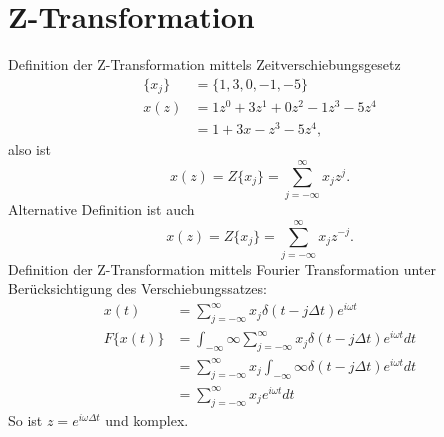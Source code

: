 \section{Z-Transformation}
Definition der Z-Transformation mittels Zeitverschiebungsgesetz
\[
\begin{split}
\{x_j\} & = \{1,3,0,-1,-5\}\\
x(z) & = 1z^0+3z^1+0z^2-1z^3-5z^4\\
& = 1+3x-z^3-5z^4,
\end{split}
\]
also ist
\begin{equation}
x(z) = Z\{x_j\} = \sum_{j=-\infty}^{\infty} x_j z^j.
\end{equation}
Alternative Definition ist auch
\[
x(z) = Z\{x_j\} = \sum_{j=-\infty}^{\infty} x_j z^{-j}.
\]
Definition der Z-Transformation mittels Fourier Transformation unter Berücksichtigung des Verschiebungssatzes:
\[
\begin{split}
x(t) & =  \sum_{j=-\infty}^{\infty} x_j \delta (t-j \Delta t) e^{i \omega t}\\
F\{x(t)\} & = \int_{-\infty}{\infty}  \sum_{j=-\infty}^{\infty} x_j \delta (t-j \Delta t) e^{i \omega t} dt\\
& = \sum_{j=-\infty}^{\infty} x_j \int_{-\infty}{\infty} \delta (t-j \Delta t) e^{i \omega t} dt\\
& = \sum_{j=-\infty}^{\infty} x_j e^{i \omega t} dt
\end{split}
\]
So ist $z = e^{i \omega \Delta t}$ und komplex.